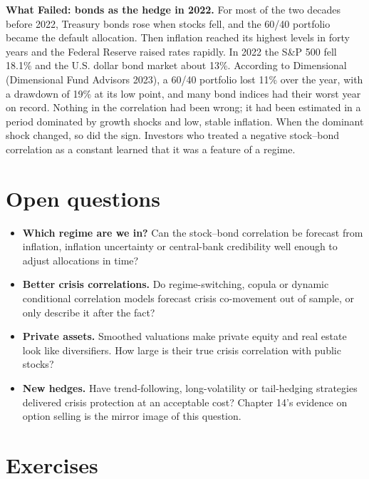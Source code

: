\begin{callout}
\textbf{What Failed: bonds as the hedge in 2022.} For most of the two decades before 2022, Treasury bonds rose when stocks fell, and the 60/40 portfolio became the default allocation. Then inflation reached its highest levels in forty years and the Federal Reserve raised rates rapidly. In 2022 the S\&P 500 fell 18.1\% and the U.S. dollar bond market about 13\%. According to Dimensional (Dimensional Fund Advisors 2023), a 60/40 portfolio lost 11\% over the year, with a drawdown of 19\% at its low point, and many bond indices had their worst year on record. Nothing in the correlation had been wrong; it had been estimated in a period dominated by growth shocks and low, stable inflation. When the dominant shock changed, so did the sign. Investors who treated a negative stock--bond correlation as a constant learned that it was a feature of a regime.
\end{callout}

\section{Open questions}
\label{sec:20-open}

\begin{itemize}
  \item \textbf{Which regime are we in?} Can the stock--bond correlation be forecast from inflation, inflation uncertainty or central-bank credibility well enough to adjust allocations in time?
  \item \textbf{Better crisis correlations.} Do regime-switching, copula or dynamic conditional correlation models forecast crisis co-movement out of sample, or only describe it after the fact?
  \item \textbf{Private assets.} Smoothed valuations make private equity and real estate look like diversifiers. How large is their true crisis correlation with public stocks?
  \item \textbf{New hedges.} Have trend-following, long-volatility or tail-hedging strategies delivered crisis protection at an acceptable cost? Chapter 14's evidence on option selling is the mirror image of this question.
\end{itemize}

\section*{Exercises}

